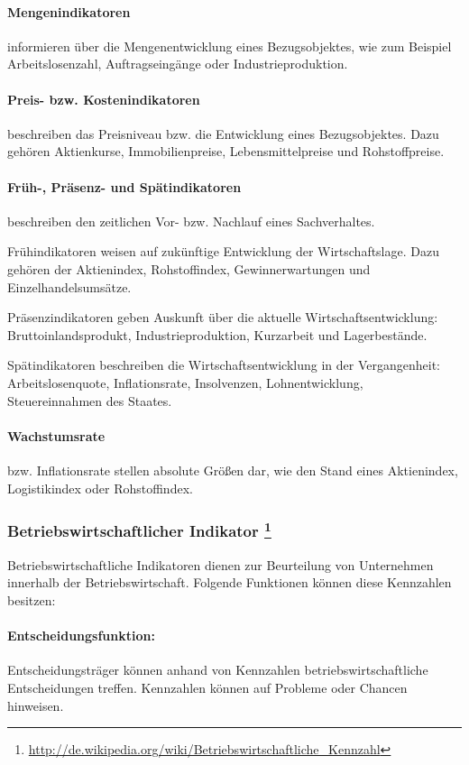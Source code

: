 \paragraph{Mengenindikatoren} informieren über die Mengenentwicklung eines Bezugsobjektes, wie zum Beispiel Arbeitslosenzahl, Auftragseingänge oder Industrieproduktion.
\paragraph{Preis- bzw. Kostenindikatoren} beschreiben das Preisniveau bzw. die Entwicklung eines Bezugsobjektes. Dazu gehören Aktienkurse, Immobilienpreise, Lebensmittelpreise und Rohstoffpreise.
\paragraph{Früh-, Präsenz- und Spätindikatoren} beschreiben den zeitlichen Vor- bzw. Nachlauf eines Sachverhaltes. 

Frühindikatoren weisen auf zukünftige Entwicklung der Wirtschaftslage. Dazu gehören der Aktienindex, Rohstoffindex, Gewinnerwartungen und Einzelhandelsumsätze. 

Präsenzindikatoren geben Auskunft über die aktuelle Wirtschaftsentwicklung: Bruttoinlandsprodukt, Industrieproduktion, Kurzarbeit und Lagerbe\-stände.

Spätindikatoren beschreiben die Wirtschaftsentwicklung in der Vergangenheit: Arbeitslosenquote, Inflationsrate, Insolvenzen, Lohnentwicklung, Steu\-ereinnahmen des Staates.

\paragraph{Wachstumsrate} bzw. Inflationsrate stellen absolute Größen dar, wie den Stand eines Aktienindex, Logistikindex oder Rohstoffindex.
   

\subsubsection[Betriebswirtschaftlicher Indikator]{Betriebswirtschaftlicher Indikator \footnote{\url{http://de.wikipedia.org/wiki/Betriebswirtschaftliche_Kennzahl}}}
Betriebswirtschaftliche Indikatoren dienen zur Beurteilung von Unternehmen innerhalb der Betriebswirtschaft. Folgende Funktionen können diese Kennzahlen besitzen:

\paragraph{Entscheidungsfunktion:} Entscheidungsträger können anhand von Kennzahlen betriebswirtschaftliche Entscheidungen treffen. Kennzahlen können auf Probleme oder Chancen hinweisen.
